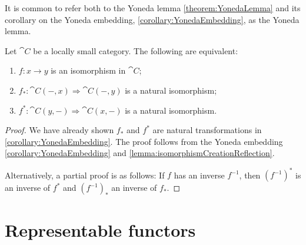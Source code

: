 It is common to refer both to the Yoneda lemma \ref{theorem:YonedaLemma} and its corollary on the Yoneda embedding, \ref{corollary:YonedaEmbedding}, as the Yoneda lemma.

\begin{proposition} \label{prop:representablyIsomorphic}
Let $\cat{C}$ be a locally small category. The following are equivalent:
\begin{enumerate}
\item $f:x\to y$ is an isomorphism in $\cat{C}$;
\item $f_*: \cat{C}(-,x) \Rightarrow \cat{C}(-,y)$ is a natural isomorphism;
\item $f^*: \cat{C}(y,-) \Rightarrow \cat{C}(x,-)$ is a natural isomorphism.
\end{enumerate}
\end{proposition}
\begin{proof}
We have already shown $f_*$ and $f^*$ are natural transformations in \ref{corollary:YonedaEmbedding}.
The proof follows from the Yoneda embedding \ref{corollary:YonedaEmbedding} and \ref{lemma:isomorphismCreationReflection}.

Alternatively, a partial proof is as follows: If $f$ has an inverse $f^{-1}$, then $(f^{-1})^*$ is an inverse of $f^*$ and $(f^{-1})_*$ an inverse of $f_*$.
\end{proof}

\section{Representable functors}
